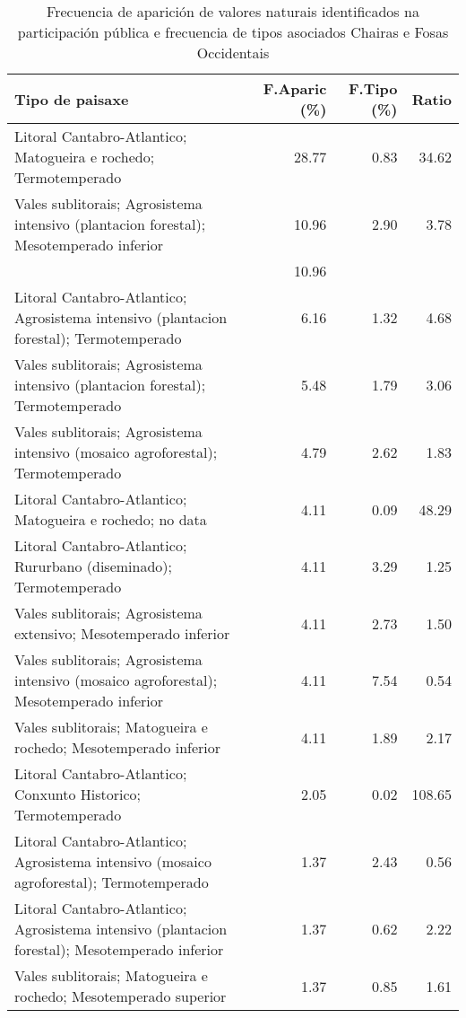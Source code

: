 \begin{table}[p]
\centering
\caption{Frecuencia de aparición de valores naturais identificados na participación pública e frecuencia de tipos asociados Chairas e Fosas Occidentais} 
\label{vsixotnat11}
\begin{tabular}{lrrr}
  \hline
Tipo de paisaxe & F.Aparic (\%) & F.Tipo (\%) & Ratio \\ 
  \hline
Litoral Cantabro-Atlantico; Matogueira e rochedo; Termotemperado & 28.77 & 0.83 & 34.62 \\ 
  Vales sublitorais; Agrosistema intensivo (plantacion forestal); Mesotemperado inferior & 10.96 & 2.90 & 3.78 \\ 
   & 10.96 &  &  \\ 
  Litoral Cantabro-Atlantico; Agrosistema intensivo (plantacion forestal); Termotemperado & 6.16 & 1.32 & 4.68 \\ 
  Vales sublitorais; Agrosistema intensivo (plantacion forestal); Termotemperado & 5.48 & 1.79 & 3.06 \\ 
  Vales sublitorais; Agrosistema intensivo (mosaico agroforestal); Termotemperado & 4.79 & 2.62 & 1.83 \\ 
  Litoral Cantabro-Atlantico; Matogueira e rochedo; no data & 4.11 & 0.09 & 48.29 \\ 
  Litoral Cantabro-Atlantico; Rururbano (diseminado); Termotemperado & 4.11 & 3.29 & 1.25 \\ 
  Vales sublitorais; Agrosistema extensivo; Mesotemperado inferior & 4.11 & 2.73 & 1.50 \\ 
  Vales sublitorais; Agrosistema intensivo (mosaico agroforestal); Mesotemperado inferior & 4.11 & 7.54 & 0.54 \\ 
  Vales sublitorais; Matogueira e rochedo; Mesotemperado inferior & 4.11 & 1.89 & 2.17 \\ 
  Litoral Cantabro-Atlantico; Conxunto Historico; Termotemperado & 2.05 & 0.02 & 108.65 \\ 
  Litoral Cantabro-Atlantico; Agrosistema intensivo (mosaico agroforestal); Termotemperado & 1.37 & 2.43 & 0.56 \\ 
  Litoral Cantabro-Atlantico; Agrosistema intensivo (plantacion forestal); Mesotemperado inferior & 1.37 & 0.62 & 2.22 \\ 
  Vales sublitorais; Matogueira e rochedo; Mesotemperado superior & 1.37 & 0.85 & 1.61 \\ 
   \hline
\end{tabular}
\end{table}
